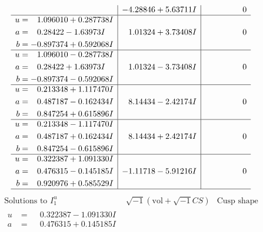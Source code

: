 \documentclass[1p]{elsarticle_modified}
\theoremstyle{definition}
\newcommand{\I}{\sqrt{-1}}
\begin{document}
$$\begin{array}{c|c|c}
 & -4.28846 + 5.63711 I & \phantom{-0.000000 } 0 \\ \hline\begin{aligned}
u &= \phantom{-}1.096010 + 0.287738 I \\
a &= \phantom{-}0.28422 - 1.63973 I \\
b &= -0.897374 + 0.592068 I\end{aligned}
 & \phantom{-}1.01324 + 3.73408 I & \phantom{-0.000000 } 0 \\ \hline\begin{aligned}
u &= \phantom{-}1.096010 - 0.287738 I \\
a &= \phantom{-}0.28422 + 1.63973 I \\
b &= -0.897374 - 0.592068 I\end{aligned}
 & \phantom{-}1.01324 - 3.73408 I & \phantom{-0.000000 } 0 \\ \hline\begin{aligned}
u &= \phantom{-}0.213348 + 1.117470 I \\
a &= \phantom{-}0.487187 - 0.162434 I \\
b &= \phantom{-}0.847254 + 0.615896 I\end{aligned}
 & \phantom{-}8.14434 - 2.42174 I & \phantom{-0.000000 } 0 \\ \hline\begin{aligned}
u &= \phantom{-}0.213348 - 1.117470 I \\
a &= \phantom{-}0.487187 + 0.162434 I \\
b &= \phantom{-}0.847254 - 0.615896 I\end{aligned}
 & \phantom{-}8.14434 + 2.42174 I & \phantom{-0.000000 } 0 \\ \hline\begin{aligned}
u &= \phantom{-}0.322387 + 1.091330 I \\
a &= \phantom{-}0.476315 - 0.145185 I \\
b &= \phantom{-}0.920976 + 0.585529 I\end{aligned}
 & -1.11718 - 5.91216 I & \phantom{-0.000000 } 0\\
 \hline 
 \end{array}$$\newpage$$\begin{array}{c|c|c}  
\text{Solutions to }I^u_{1}& \I (\text{vol} + \sqrt{-1}CS) & \text{Cusp shape}\\
 \hline 
\begin{aligned}
u &= \phantom{-}0.322387 - 1.091330 I \\
a &= \phantom{-}0.476315 + 0.145185 I \\

\end{aligned}
\end{array}$$
\end{document}
